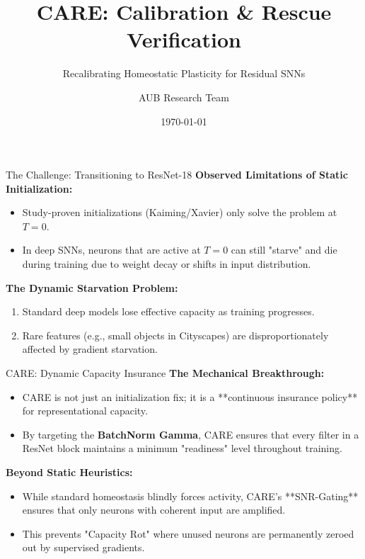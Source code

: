 \documentclass[aspectratio=169]{beamer}
\title{CARE: Calibration \& Rescue Verification}
\subtitle{Recalibrating Homeostatic Plasticity for Residual SNNs}
\author{AUB Research Team}
\date{\today}
\begin{document}
\begin{frame}
    \titlepage
\end{frame}

\begin{frame}{The Challenge: Transitioning to ResNet-18}
    \textbf{Observed Limitations of Static Initialization:}
    \begin{itemize}
        \item Study-proven initializations (Kaiming/Xavier) only solve the problem at $T=0$.
        \item In deep SNNs, neurons that are active at $T=0$ can still "starve" and die during training due to weight decay or shifts in input distribution.
    \end{itemize}
    
    \vspace{0.3cm}
    \textbf{The Dynamic Starvation Problem:}
    \begin{enumerate}
        \item Standard deep models lose effective capacity as training progresses.
        \item Rare features (e.g., small objects in Cityscapes) are disproportionately affected by gradient starvation.
    \end{enumerate}
\end{frame}

\begin{frame}{CARE: Dynamic Capacity Insurance}
    \textbf{The Mechanical Breakthrough:}
    \begin{itemize}
        \item CARE is not just an initialization fix; it is a **continuous insurance policy** for representational capacity.
        \item By targeting the \textbf{BatchNorm Gamma}, CARE ensures that every filter in a ResNet block maintains a minimum "readiness" level throughout training.
    \end{itemize}
    
    \vspace{0.3cm}
    \textbf{Beyond Static Heuristics:}
    \begin{itemize}
        \item While standard homeostasis blindly forces activity, CARE’s **SNR-Gating** ensures that only neurons with coherent input are amplified.
        \item This prevents "Capacity Rot" where unused neurons are permanently zeroed out by supervised gradients.
    \end{itemize}
\end{frame}
\end{document}
